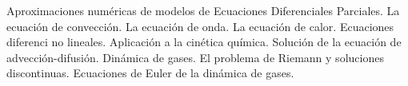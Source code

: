Aproximaciones numéricas de modelos de Ecuaciones Diferenciales Parciales.
La ecuación de convección.
La ecuación de onda.
La ecuación de calor.
Ecuaciones diferenci no lineales.
Aplicación a la cinética química.
Solución de la ecuación de advección-difusión.
Dinámica de gases.
El problema de Riemann y soluciones discontinuas.
Ecuaciones de Euler de la dinámica de gases.








